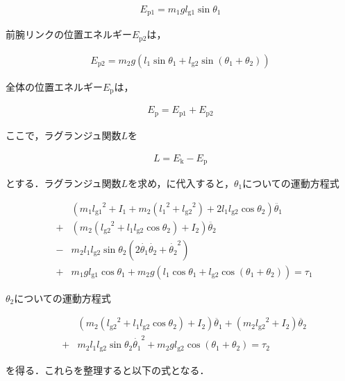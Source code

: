 \begin{eqnarray}
  E_{\mathrm{p1}}
  =m_{1}gl_{\mathrm{g1}}\sin\theta_{1}
\end{eqnarray}

前腕リンクの位置エネルギー$E_{\mathrm{p2}}$は，

\begin{eqnarray}
  E_{\mathrm{p2}}
  =m_{2}g(l_{1}\sin\theta_{1} + l_{\mathrm{g2}}\sin(\theta_{1} + \theta_{2}))
\end{eqnarray}

全体の位置エネルギー$E_{\mathrm{p}}$は，

\begin{eqnarray}
  E_{\mathrm{p}}
  =E_{\mathrm{p1}} + E_{\mathrm{p2}}
\end{eqnarray}

ここで，ラグランジュ関数$L$を

\begin{eqnarray}
  L
  =E_{\mathrm{k}} - E_{\mathrm{p}}
\end{eqnarray}

とする．ラグランジュ関数$L$を求め，に代入すると，$\theta_{1}$についての運動方程式

\begin{eqnarray}
  &&(m_{1}{l_{\mathrm{g1}}}^2 + I_{1} + m_{2}({l_{1}}^2 + {l_{\mathrm{g2}}}^2)
  + 2l_{1}l_{\mathrm{g2}}\cos\theta_{2})\ddot{\theta_{1}} \nonumber \\
  &+& (m_{2}({l_{\mathrm{g2}}}^2 + l_{1}l_{\mathrm{g2}}\cos\theta_{2}) + I_{2})\ddot{\theta_{2}} \nonumber \\
  &-& m_{2}l_{1}l_{\mathrm{g2}}\sin\theta_{2}(2\dot{\theta_{1}}\dot{\theta_{2}} + {\dot{\theta_{2}}}^2)  \nonumber \\
  &+& m_{1}gl_{\mathrm{g1}}\cos\theta_{1} + m_{2}g(l_{1}\cos\theta_{1} + l_{\mathrm{g2}}\cos(\theta_{1} + \theta_{2})) = \tau_{1}
\end{eqnarray}

$\theta_{2}$についての運動方程式

\begin{eqnarray}
  &&(m_{2}({l_{\mathrm{g2}}}^2 + l_{1}l_{\mathrm{g2}}\cos\theta_{2}) + I_{2})\ddot{\theta_{1}} + (m_{2}{l_{\mathrm{g2}}}^2 + I_{2})\ddot{\theta_{2}} \nonumber \\
  &+& m_{2}l_{1}l_{\mathrm{g2}}\sin\theta_{2}{\dot{\theta_{1}}}^2 + m_{2}gl_{\mathrm{g2}}\cos(\theta_{1} + \theta_{2}) = \tau_{2}
\end{eqnarray}

を得る．これらを整理すると以下の式となる．

